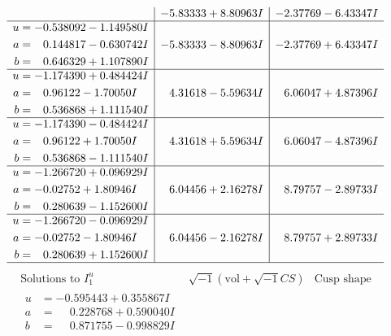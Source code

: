 \documentclass[1p]{elsarticle_modified}
\theoremstyle{definition}
\newcommand{\I}{\sqrt{-1}}
\begin{document}
$$\begin{array}{c|c|c}
 & -5.83333 + 8.80963 I & -2.37769 - 6.43347 I \\ \hline\begin{aligned}
u &= -0.538092 - 1.149580 I \\
a &= \phantom{-}0.144817 - 0.630742 I \\
b &= \phantom{-}0.646329 + 1.107890 I\end{aligned}
 & -5.83333 - 8.80963 I & -2.37769 + 6.43347 I \\ \hline\begin{aligned}
u &= -1.174390 + 0.484424 I \\
a &= \phantom{-}0.96122 - 1.70050 I \\
b &= \phantom{-}0.536868 + 1.111540 I\end{aligned}
 & \phantom{-}4.31618 - 5.59634 I & \phantom{-}6.06047 + 4.87396 I \\ \hline\begin{aligned}
u &= -1.174390 - 0.484424 I \\
a &= \phantom{-}0.96122 + 1.70050 I \\
b &= \phantom{-}0.536868 - 1.111540 I\end{aligned}
 & \phantom{-}4.31618 + 5.59634 I & \phantom{-}6.06047 - 4.87396 I \\ \hline\begin{aligned}
u &= -1.266720 + 0.096929 I \\
a &= -0.02752 + 1.80946 I \\
b &= \phantom{-}0.280639 - 1.152600 I\end{aligned}
 & \phantom{-}6.04456 + 2.16278 I & \phantom{-}8.79757 - 2.89733 I \\ \hline\begin{aligned}
u &= -1.266720 - 0.096929 I \\
a &= -0.02752 - 1.80946 I \\
b &= \phantom{-}0.280639 + 1.152600 I\end{aligned}
 & \phantom{-}6.04456 - 2.16278 I & \phantom{-}8.79757 + 2.89733 I\\
 \hline 
 \end{array}$$\newpage$$\begin{array}{c|c|c}  
\text{Solutions to }I^u_{1}& \I (\text{vol} + \sqrt{-1}CS) & \text{Cusp shape}\\
 \hline 
\begin{aligned}
u &= -0.595443 + 0.355867 I \\
a &= \phantom{-}0.228768 + 0.590040 I \\
b &= \phantom{-}0.871755 - 0.998829 I\end{aligned}

\end{array}$$
\end{document}

